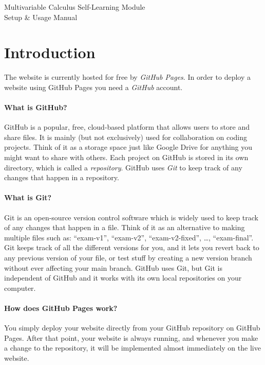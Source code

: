 \documentclass[a4paper,10pt]{article}
\begin{document}
\begingroup
\centering
\LARGE Multivariable Calculus Self-Learning Module\\[1em]
\large Setup \& Usage Manual\\[4\baselineskip]
\endgroup

\tableofcontents

\clearpage

\listoffigures

\clearpage

\section{Introduction}

The website is currently hosted for free by \emph{GitHub Pages}. In order to deploy a website using GitHub Pages you need a \emph{GitHub} account. 

\paragraph{What is GitHub?} GitHub is a popular, free, cloud-based platform that allows users to store and share files. It is mainly (but not exclusively) used for collaboration on coding projects. Think of it as a storage space just like Google Drive for anything you might want to share with others. Each project on GitHub is stored in its own directory, which is called a \emph{repository}. GitHub uses \emph{Git} to keep track of any changes that happen in a repository.

\paragraph{What is Git?} Git is an open-source version control software which is widely used to keep track of any changes that happen in a file. Think of it as an alternative to making multiple files such as: ``exam-v1'', ``exam-v2'', ``exam-v2-fixed'', \dots, ``exam-final''. Git keeps track of all the different versions for you, and it lets you revert back to any previous version of your file, or test stuff by creating a new version branch without ever affecting your main branch. GitHub uses Git, but Git is independent of GitHub and it works with its own local repositories on your computer.

\paragraph{How does GitHub Pages work?} You simply deploy your website directly from your GitHub repository on GitHub Pages. After that point, your website is always running, and whenever you make a change to the repository, it will be implemented almost immediately on the live website.
\end{document}

